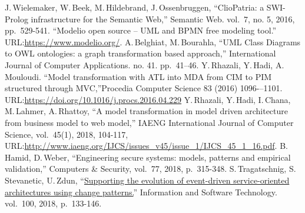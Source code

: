 \documentclass[conference]{IEEEtran} \IEEEoverridecommandlockouts
\begin{document}
\begin{thebibliography}{99} 

 J.\,Wielemaker, W.\,Beek, M.\,Hildebrand, J.\,Ossenbruggen, ``ClioPatria: a SWI-Prolog infrastructure for the Semantic Web,'' Semantic Web. vol.~7, no. 5, 2016, pp.~529-541.  ``Modelio open source -- UML and BPMN free modeling tool.'' URL:\url{https://www.modelio.org/}.  A.\,Belghiat, M.\,Bourahla, ``UML Class Diagrams to OWL ontologies: a graph transformation based approach,'' International Journal of Computer Applications. no. 41. pp.~41--46. Y.\,Rhazali, Y.\,Hadi, A.\,Mouloudi. ``Model transformation with ATL into MDA from CIM to PIM structured through MVC,''Procedia Computer Science 83 (2016) 1096-–1101. URL:\url{https://doi.org/10.1016/j.procs.2016.04.229}  Y.\,Rhazali, Y.\,Hadi, I.\,Chana, M.\,Lahmer, A.\,Rhattoy, ``A model transformation in model driven architecture from business model to web model,'' IAENG International Journal of Computer Science, vol.~45(1), 2018, 104-117, URL:\url{http://www.iaeng.org/IJCS/issues_v45/issue_1/IJCS_45_1_16.pdf}.  B.\,Hamid, D.\,Weber, ``Engineering secure systems: models, patterns and empirical validation,'' Computers \& Security, vol.~77, 2018, p.~315-348.  S.\,Tragatschnig, S.\,Stevanetic, U.\,Zdun, ``\href{https://www.sciencedirect.com/science/article/abs/pii/S0950584916303251}{Supporting the evolution of event-driven service-oriented architectures using change patterns.}'' Information and Software Technology. vol.~100, 2018, p.~133-146. 


\end{thebibliography}
\end{document}
